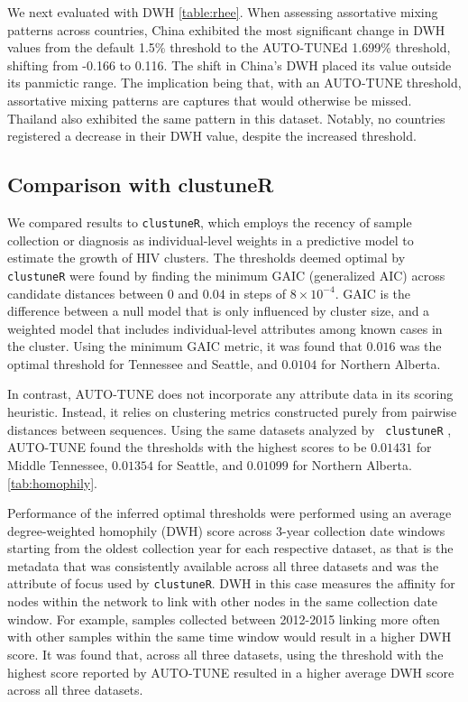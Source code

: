 \documentclass[utf8]{FrontiersinHarvard} %
\newcommand{\TODO}[1]{{\color{red}{#1}}}
\begin{document}
We next evaluated \citep{rhee_national_2019} with DWH \ref{table:rhee}. When
assessing assortative mixing patterns across countries, China exhibited the
most significant change in DWH values from the default 1.5\% threshold to the
AUTO-TUNEd 1.699\% threshold, shifting from -0.166 to 0.116. The shift in
China's DWH placed its value outside its panmictic range. The implication being
that, with an AUTO-TUNE threshold, assortative mixing patterns are captures
that would otherwise be missed. Thailand also exhibited the same pattern in
this dataset. Notably, no countries registered a decrease in their DWH value,
despite the increased threshold.
\label{fig:scoreAbove2}



\subsection{Comparison with clustuneR}

We compared results to {\tt clustuneR}, which employs the recency of sample
collection or diagnosis as individual-level weights in a predictive model to
estimate the growth of HIV clusters. The thresholds deemed optimal by {\tt
		clustuneR} were found by finding the minimum GAIC (generalized AIC) across
candidate distances between $0$ and $0.04$ in steps of $8 \times 10^{-4}$. GAIC
is the difference between a null model that is only influenced by cluster size,
and a weighted model that includes individual-level attributes among known
cases in the cluster. Using the minimum GAIC metric, it was found that $0.016$
was the optimal threshold for Tennessee and Seattle, and $0.0104$ for Northern
Alberta.

In contrast, AUTO-TUNE does not incorporate any attribute data in its scoring
heuristic. Instead, it relies on clustering metrics constructed purely from
pairwise distances between sequences. Using the same datasets analyzed by {\tt
		clustuneR} \citep{chato_public_2020}, AUTO-TUNE found the thresholds with the
highest scores to be $0.01431$ for Middle Tennessee, $0.01354$ for Seattle, and
$0.01099$ for Northern Alberta. \autoref{tab:homophily}. 

\TODO{discuss how our thresholds perform vs the published thresholds; look at the GAIC plots}

Performance of the inferred optimal thresholds were performed using an average
degree-weighted homophily (DWH) score across 3-year collection date windows
starting from the oldest collection year for each respective dataset, as that
is the metadata that was consistently available across all three datasets and
was the attribute of focus used by {\tt clustuneR}. DWH in this case measures
the affinity for nodes within the network to link with other nodes in the same
collection date window. For example, samples collected between 2012-2015
linking more often with other samples within the same time window would result
in a higher DWH score. It was found that, across all three datasets, using the
threshold with the highest score reported by AUTO-TUNE resulted in a higher
average DWH score across all three datasets. \TODO{compared to what?}
\end{document}
